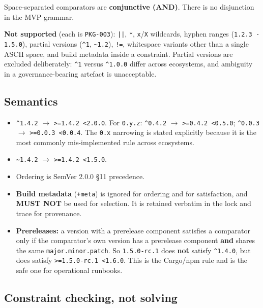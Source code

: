 Space-separated comparators are \textbf{conjunctive (AND)}. There is no
disjunction in the MVP grammar.

\textbf{Not supported} (each is \texttt{PKG-003}): \texttt{||}, \texttt{*},
\texttt{x}/\texttt{X} wildcards, hyphen ranges (\texttt{1.2.3 - 1.5.0}),
partial versions (\texttt{\^{}1}, \texttt{\textasciitilde{}1.2}),
\texttt{!=}, whitespace variants other than a single ASCII space, and build
metadata inside a constraint. Partial versions are excluded deliberately:
\texttt{\^{}1} versus \texttt{\^{}1.0.0} differ across ecosystems, and
ambiguity in a governance-bearing artefact is unacceptable.

\subsection{Semantics}

\begin{itemize}
  \item \texttt{\^{}1.4.2} $\to$ \texttt{>=1.4.2 <2.0.0}. For \texttt{0.y.z}:
        \texttt{\^{}0.4.2} $\to$ \texttt{>=0.4.2 <0.5.0};
        \texttt{\^{}0.0.3} $\to$ \texttt{>=0.0.3 <0.0.4}. The \texttt{0.x}
        narrowing is stated explicitly because it is the most commonly
        mis-implemented rule across ecosystems.
  \item \texttt{\textasciitilde{}1.4.2} $\to$ \texttt{>=1.4.2 <1.5.0}.
  \item Ordering is SemVer 2.0.0 \S11 precedence.
  \item \textbf{Build metadata} (\texttt{+meta}) is ignored for ordering and
        for satisfaction, and \textbf{MUST NOT} be used for selection. It is
        retained verbatim in the lock and trace for provenance.
  \item \textbf{Prereleases:} a version with a prerelease component satisfies
        a comparator only if the comparator's own version has a prerelease
        component \textbf{and} shares the same \texttt{major.minor.patch}.
        So \texttt{1.5.0-rc.1} does \textbf{not} satisfy \texttt{\^{}1.4.0},
        but does satisfy \texttt{>=1.5.0-rc.1 <1.6.0}. This is the
        Cargo/npm rule and is the safe one for operational runbooks.
\end{itemize}

\subsection{Constraint checking, not solving}

